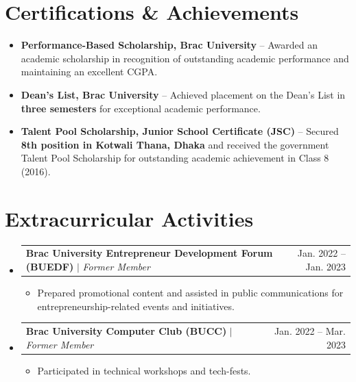 \documentclass[letterpaper,10pt]{article}
\makeatletter
\newcommand{\resumeItem}[1]{
  \item\small{
    {#1 \vspace{-2pt}}
  }
}
\newcommand{\resumeProjectHeading}[2]{
    \item
    \begin{tabular*}{0.97\textwidth}{l@{\extracolsep{\fill}}r}
      \small#1 & #2 \\
    \end{tabular*}\vspace{-7pt}
}
\newcommand{\resumeSubHeadingListStart}{\begin{itemize}[leftmargin=0.15in, label={}]}
\newcommand{\resumeSubHeadingListEnd}{\end{itemize}}
\newcommand{\resumeItemListStart}{\begin{itemize}}
\newcommand{\resumeItemListEnd}{\end{itemize}\vspace{-5pt}}
\makeatother
\begin{document}
\section{Certifications \& Achievements}

 \begin{itemize}[leftmargin=0.15in]
\item \small{\textbf{Performance-Based Scholarship, Brac University} -- Awarded an academic scholarship in recognition of outstanding academic performance and maintaining an excellent CGPA.}

\item \small{\textbf{Dean's List, Brac University} -- Achieved placement on the Dean's List in \textbf{three semesters} for exceptional academic performance.}

\item \small{\textbf{Talent Pool Scholarship, Junior School Certificate (JSC)} -- Secured \textbf{8th position in Kotwali Thana, Dhaka} and received the government Talent Pool Scholarship for outstanding academic achievement in Class 8 (2016).}

\end{itemize}


\section{Extracurricular Activities}
  \resumeSubHeadingListStart

\resumeProjectHeading
{\textbf{Brac University Entrepreneur Development Forum (BUEDF)} $|$ \emph{Former Member}}{Jan. 2022 -- Jan. 2023}
\resumeItemListStart
\resumeItem{Prepared promotional content and assisted in public communications for entrepreneurship-related events and initiatives.}
\resumeItemListEnd
  
    \resumeProjectHeading
      {\textbf{Brac University Computer Club (BUCC)} $|$ \emph{Former Member}}{Jan. 2022 -- Mar. 2023}
      \resumeItemListStart
        \resumeItem{Participated in technical workshops and tech-fests.}
      \resumeItemListEnd

  \resumeSubHeadingListEnd

\end{document}
